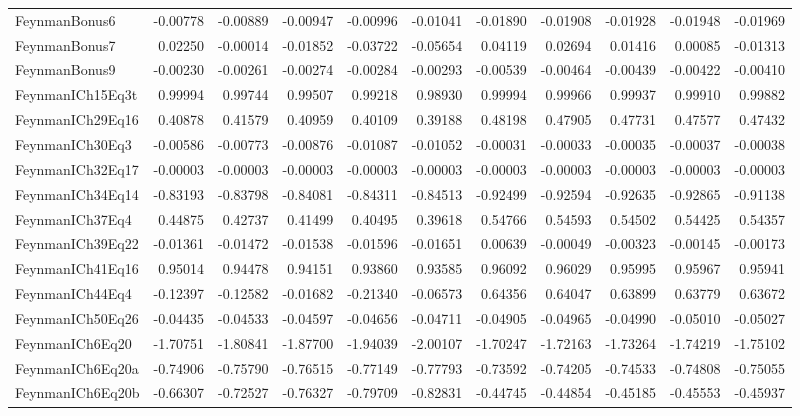 \begin{tabular}{lrrrrrrrrrr}
FeynmanBonus6 & -0.00778 & -0.00889 & -0.00947 & -0.00996 & -0.01041 & -0.01890 & -0.01908 & -0.01928 & -0.01948 & -0.01969 \\
FeynmanBonus7 & 0.02250 & -0.00014 & -0.01852 & -0.03722 & -0.05654 & 0.04119 & 0.02694 & 0.01416 & 0.00085 & -0.01313 \\
FeynmanBonus9 & -0.00230 & -0.00261 & -0.00274 & -0.00284 & -0.00293 & -0.00539 & -0.00464 & -0.00439 & -0.00422 & -0.00410 \\
FeynmanICh15Eq3t & 0.99994 & 0.99744 & 0.99507 & 0.99218 & 0.98930 & 0.99994 & 0.99966 & 0.99937 & 0.99910 & 0.99882 \\
FeynmanICh29Eq16 & 0.40878 & 0.41579 & 0.40959 & 0.40109 & 0.39188 & 0.48198 & 0.47905 & 0.47731 & 0.47577 & 0.47432 \\
FeynmanICh30Eq3 & -0.00586 & -0.00773 & -0.00876 & -0.01087 & -0.01052 & -0.00031 & -0.00033 & -0.00035 & -0.00037 & -0.00038 \\
FeynmanICh32Eq17 & -0.00003 & -0.00003 & -0.00003 & -0.00003 & -0.00003 & -0.00003 & -0.00003 & -0.00003 & -0.00003 & -0.00003 \\
FeynmanICh34Eq14 & -0.83193 & -0.83798 & -0.84081 & -0.84311 & -0.84513 & -0.92499 & -0.92594 & -0.92635 & -0.92865 & -0.91138 \\
FeynmanICh37Eq4 & 0.44875 & 0.42737 & 0.41499 & 0.40495 & 0.39618 & 0.54766 & 0.54593 & 0.54502 & 0.54425 & 0.54357 \\
FeynmanICh39Eq22 & -0.01361 & -0.01472 & -0.01538 & -0.01596 & -0.01651 & 0.00639 & -0.00049 & -0.00323 & -0.00145 & -0.00173 \\
FeynmanICh41Eq16 & 0.95014 & 0.94478 & 0.94151 & 0.93860 & 0.93585 & 0.96092 & 0.96029 & 0.95995 & 0.95967 & 0.95941 \\
FeynmanICh44Eq4 & -0.12397 & -0.12582 & -0.01682 & -0.21340 & -0.06573 & 0.64356 & 0.64047 & 0.63899 & 0.63779 & 0.63672 \\
FeynmanICh50Eq26 & -0.04435 & -0.04533 & -0.04597 & -0.04656 & -0.04711 & -0.04905 & -0.04965 & -0.04990 & -0.05010 & -0.05027 \\
FeynmanICh6Eq20 & -1.70751 & -1.80841 & -1.87700 & -1.94039 & -2.00107 & -1.70247 & -1.72163 & -1.73264 & -1.74219 & -1.75102 \\
FeynmanICh6Eq20a & -0.74906 & -0.75790 & -0.76515 & -0.77149 & -0.77793 & -0.73592 & -0.74205 & -0.74533 & -0.74808 & -0.75055 \\
FeynmanICh6Eq20b & -0.66307 & -0.72527 & -0.76327 & -0.79709 & -0.82831 & -0.44745 & -0.44854 & -0.45185 & -0.45553 & -0.45937 \\

\end{tabular}
